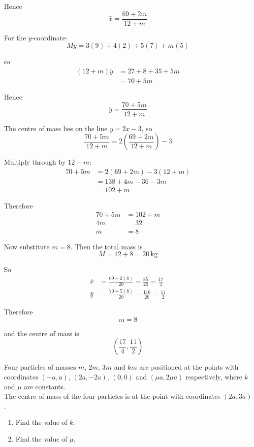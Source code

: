 \documentclass[leqno]{article}
\begin{document}
\begin{enumerate}[
  label=\textbf{\arabic*.},
  leftmargin=*,
  topsep=0pt,
  partopsep=0pt,
  parsep=0pt
]
\begin{djsSolution}
Hence
\[
\bar{x}=\frac{69+2m}{12+m}
\]

For the \(y\)-coordinate:
\[
M\bar{y}=3(9)+4(2)+5(7)+m(5)
\]

so
\begin{align*}
(12+m)\bar{y}&=27+8+35+5m\\
&=70+5m
\end{align*}

Hence
\[
\bar{y}=\frac{70+5m}{12+m}
\]

The centre of mass lies on the line \(y=2x-3\), so
\[
\frac{70+5m}{12+m}=2\left(\frac{69+2m}{12+m}\right)-3
\]

Multiply through by \(12+m\):
\begin{align*}
70+5m&=2(69+2m)-3(12+m)\\
&=138+4m-36-3m\\
&=102+m
\end{align*}

Therefore
\begin{align*}
70+5m&=102+m\\
4m&=32\\
m&=8
\end{align*}

Now substitute \(m=8\).
Then the total mass is
\[
M=12+8=20\,\mathrm{kg}
\]

So
\begin{align*}
\bar{x}&=\frac{69+2(8)}{20}=\frac{85}{20}=\frac{17}{4}\\
\bar{y}&=\frac{70+5(8)}{20}=\frac{110}{20}=\frac{11}{2}
\end{align*}

Therefore
\[
m=8
\]

and the centre of mass is
\[
\left(\frac{17}{4},\frac{11}{2}\right)
\]
\end{djsSolution}


\newpage

\questionitem

Four particles of masses $m$, $2m$, $3m$ and $km$ are positioned at the points with coordinates $(-a, a)$, $(2a, -2a)$, $(0, 0)$ and $(\mu a, 2\mu a)$ respectively, where $k$ and $\mu$ are constants. \\

The centre of mass of the four particles is at the point with coordinates $(2a, 3a)$. \\

\begin{enumerate}[label=\textbf{(\alph*)}]
  \item Find the value of $k$.  \\
  \item Find the value of $\mu$.  \\
\end{enumerate}


\end{enumerate}
\end{document}
